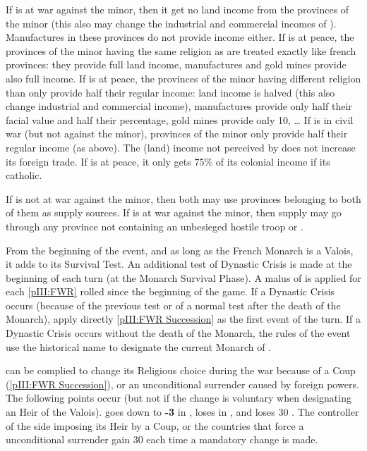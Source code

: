 \aparag[Incomes]
\bparag If \FRA is at war against the minor, then it get no land income from
the provinces of the minor (this also may change the industrial and commercial
incomes of \FRA). Manufactures in these provinces do not provide income
either.
\bparag If \FRA is at peace, the provinces of the minor having the same
religion as \FRA are treated exactly like french provinces: they provide full
land income, manufactures and gold mines provide also full income.
\bparag If \FRA is at peace, the provinces of the minor having different
religion than \FRA only provide half their regular income: land income is
halved (this also change industrial and commercial income), manufactures
provide only half their facial value and half their percentage, gold mines
provide only 10\ducats, \ldots
\bparag If \FRA is in civil war (but not against the minor), provinces of the
minor only provide half their regular income (as above).
\bparag The (land) income not perceived by \FRA does not increase its foreign
trade.
\bparag If \FRA is at peace, it only gets 75\% of its colonial income if its
catholic.

\bparag If \FRA is not at war against the minor, then both may use provinces
belonging to both of them as supply sources.
\bparag If \FRA is at war against the minor, then supply may go through any
province not containing an unbesieged hostile troop or \REVOLT .

\effetlong
{}
\bparag From the beginning of the event, and as long as the French Monarch is
a Valois, it adds  to its Survival Test.
\bparag An additional test of Dynastic Crisis is made at the beginning of each
turn (at the Monarch Survival Phase). A malus of  is applied for
each \ref{pIII:FWR} rolled since the beginning of the game.
\bparag If a Dynastic Crisis occurs (because of the previous test or of a
normal test after the death of the Monarch), apply directly \ref{pIII:FWR
  Succession} as the first event of the turn.  If a Dynastic Crisis occurs
without the death of the Monarch, the rules of the event use the historical
name  to designate the current Monarch of \FRA.

 \FRA can be complied to change
its Religious choice during the war because of a Coup (\ref{pIII:FWR
  Succession}), or an unconditional surrender caused by foreign powers. The
following points occur (but not if the change is voluntary when designating an
Heir of the Valois).
\bparag \FRA goes down to {\bf -3} in \STAB, loses  in \FTI, and
loses 30 \PV.
\bparag The controller of the side imposing its Heir by a Coup, or the
countries that force a unconditional surrender gain 30 \PV each time a
mandatory change is made.

